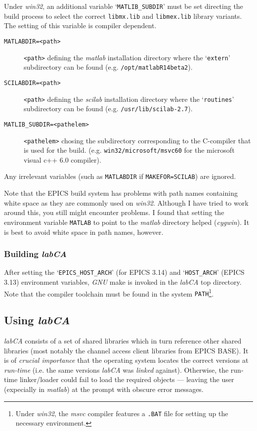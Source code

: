\documentclass{article}
\newcommand{\sca}{\ita{labCA}}
\newcommand{\scilab}{\ita{scilab}}
\newcommand{\matlab}{\ita{matlab}}
\newcommand{\windoze}{\ita{win32}}
\newcommand{\com}[1]{{\tt #1}}
\newcommand{\pbrk}{\pagebreak[3]}
\newcommand{\ita}[1]{\emph{#1}}
\renewcommand{\pbrk}{}
\begin{document}
\begin{description}
Under \windoze{}, an additional variable
`\com{MATLIB\_SUBDIR}' must be set directing the build process to select the correct
\com{libmx.lib} and \com{libmex.lib} library variants. The setting of this variable
is compiler dependent.
\begin{description}
\item[\tt MATLABDIR=<path>] \com{<path>} defining the \matlab{} installation
directory where the `\com{extern}' subdirectory can be found (e.g.
\com{/opt/matlabR14beta2}).
\item[\tt SCILABDIR=<path>] \com{<path>} defining the \scilab{} installation
directory where the `\com{routines}' subdirectory can be found (e.g.
\com{/usr/lib/scilab-2.7}).
\item[\tt MATLIB\_SUBDIR=<pathelem>] \com{<pathelem>} chosing the subdirectory
corresponding to the C-compiler that is used for the build. (e.g. 
\com{win32/microsoft/msvc60} for the microsoft visual c++ 6.0 compiler).
\end{description}
\end{description}
Any irrelevant variables (such as \com{MATLABDIR} if \com{MAKEFOR=SCILAB})
are ignored.

Note that the EPICS build system has problems with path names containing
white space as they are commonly used on \windoze. Although I have
tried to work around this, you still might encounter problems. I found
that setting the environment variable \com{MATLAB} to point to the \matlab{}
directory helped (\ita{cygwin}). It is best to avoid white space in path
names, however.

\subsubsection{Building \sca}
After setting the
`\com{EPICS\_HOST\_ARCH}' (for EPICS 3.14) and `\com{HOST\_ARCH}' (EPICS 3.13)
environment variables, \ita{GNU} make is invoked in the \sca{} top 
directory. Note that the compiler toolchain must be found in the system
\com{PATH}\footnote{
Under \windoze, the \ita{msvc} compiler features a \com{.BAT} file for
setting up the necessary environment.
}.

\pbrk
\subsection{Using \sca{}}
\sca{} consists of a set of shared libraries which in turn reference
other shared libraries (most notably the channel access client libraries
from EPICS BASE). It is of \ita{crucial importance} that the operating
system locates the correct versions at \ita{run-time} (i.e. the same versions
\sca{} was \ita{linked} against). Otherwise, the run-time linker/loader
could fail to load the required objects --- leaving the user (expecially
in \matlab) at the prompt with obscure error messages.
\end{document}
